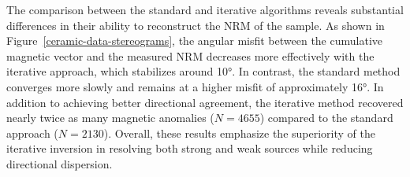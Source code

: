 The comparison between the standard and iterative algorithms reveals substantial differences in their ability to reconstruct the NRM of the sample. As shown in Figure~\ref{ceramic-data-stereograms}, the angular misfit between the cumulative magnetic vector and the measured NRM decreases more effectively with the iterative approach, which stabilizes around \ang{10}. In contrast, the standard method converges more slowly and remains at a higher misfit of approximately \ang{16}. In addition to achieving better directional agreement, the iterative method recovered nearly twice as many magnetic anomalies (\(N=4655\)) compared to the standard approach (\(N=2130\)). Overall, these results emphasize the superiority of the iterative inversion in resolving both strong and weak sources while reducing directional dispersion.


